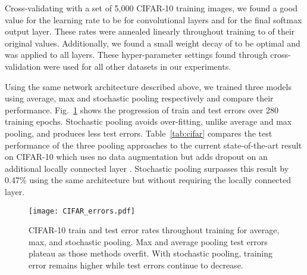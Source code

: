 \documentclass{article} \usepackage{nips12submit_e,times}
\newcommand{\fig}[1]{Fig.~\ref{fig:#1}}
\newcommand{\tab}[1]{Table~\ref{tab:#1}}
\begin{document}
Cross-validating with a set of 5,000 CIFAR-10 training images, we
found a good value for the learning rate  to be
 for convolutional layers and  for the final softmax
output layer. These rates were annealed linearly throughout training
to  of their original values.
Additionally, we found a small weight decay of  to be optimal
and was applied to all layers. These hyper-parameter settings found through cross-validation were
used for all other datasets in our experiments.


Using the same network architecture described above, we trained
three models using average, max and stochastic pooling respectively and compare
their performance. \fig{cifar} shows the progression of train and test
errors over 280 training epochs. Stochastic pooling avoids
over-fitting, unlike average and max pooling, and produces less test
errors. \tab{cifar} compares the test performance of the three pooling
approaches to the current state-of-the-art result on CIFAR-10 which uses no data augmentation but
adds dropout on an additional locally connected layer
\cite{Hinton12}. Stochastic pooling surpasses this
result by 0.47\% using the same architecture but without requiring the
locally connected layer.





\begin{figure}[t!]
\vspace*{-0.3cm}
\begin{center}
\texttt{[image: CIFAR\_errors.pdf]}
\end{center}
\vspace*{-0.6cm}
\caption{CIFAR-10 train and test error rates throughout training for
  average, max, and stochastic pooling. Max and average pooling test
  errors plateau as those methods overfit. With stochastic pooling,
  training error remains higher while test errors continue to
  decrease.\footnotemark[1]}
\label{fig:cifar}
\vspace*{-0.3cm}
\end{figure}
\end{document}
